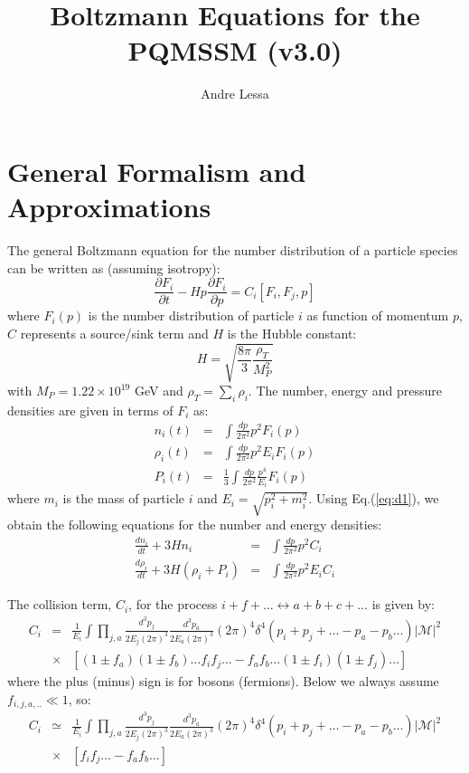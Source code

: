 \documentclass[preprint,notoc]{JHEP3}
\title{Boltzmann Equations for the PQMSSM (v3.0)}
\author{Andre Lessa}
\newcommand\drv[2]{\frac{\partial #1}{\partial #2}}
\newcommand\Drv[2]{\frac{d #1}{d #2}}
\begin{document}
\section{General Formalism and Approximations}

The general Boltzmann equation for the number distribution of a particle species can be written as\cite{turner} (assuming isotropy):
\begin{equation}
\drv{F_{i}}{t} -H p \drv{F_{i}}{p} = C_{i}[F_{i},F_{j},p] \label{eq:d1}
\end{equation}
where $F_{i}(p)$ is the number distribution of particle $i$ as function of momentum $p$, $C$ represents a source/sink term and $H$ is the Hubble constant:
\begin{equation}
H = \sqrt{\frac{8 \pi}{3} \frac{\rho_T}{M_P^2}} \label{H} 
\end{equation} 
with $M_{P} = 1.22\times 10^{19}$ GeV and $\rho_T = \sum_{i} \rho_i$. The number, energy and pressure densities are given in terms
of $F_{i}$ as:
\begin{eqnarray}
n_{i}(t) & = & \int \frac{dp}{2 \pi^2} p^2 F_i(p) \nonumber \\ 
\rho_{i}(t) & = & \int \frac{dp}{2 \pi^2} p^2 E_i F_i(p) \label{beqs}\\
P_{i}(t) & = & \frac{1}{3} \int \frac{dp}{2 \pi^2} \frac{p^4}{E_i} F_i(p) \nonumber
\end{eqnarray}
where $m_i$ is the mass of particle $i$ and $E_i = \sqrt{p_i^2 + m_i^2}$. Using Eq.(\ref{eq:d1}), we obtain the following equations for the number and energy densities:
\begin{eqnarray}
\Drv{n_i}{t} + 3H n_i & = & \int \frac{dp}{2 \pi^2} p^2 C_i \nonumber \\
\Drv{\rho_i}{t} + 3H (\rho_i + P_i) & = & \int \frac{dp}{2 \pi^2} p^2 E_i C_i \label{eq:meqs}
\end{eqnarray}

The collision term, $C_i$, for the process $i + f + \ldots \leftrightarrow a
+ b + c + \ldots$ is given by\cite{kawasaki0}:
\begin{eqnarray}
C_i & = & \frac{1}{E_i} \int \prod_{j,a} \frac{d^3 p_j}{2 E_j (2 \pi)^3}
\frac{d^3 p_a}{2 E_a (2 \pi)^3} (2 \pi)^4 \delta^{4}\left(p_i + p_j + \ldots - p_a - p_b
\ldots\right) |\mathcal{M}|^2 \nonumber \\
&\times& \left[(1 \pm f_a) (1 \pm
f_b)\ldots f_i f_j\ldots - f_a f_b \ldots (1 \pm f_i)(1 \pm f_j)\ldots \right]
\end{eqnarray}
where the plus (minus) sign is for bosons (fermions). Below we always assume
$f_{i,j,a,..} \ll 1$, so:
\begin{eqnarray}
C_i & \simeq & \frac{1}{E_i} \int \prod_{j,a} \frac{d^3 p_j}{2 E_j (2 \pi)^3}
\frac{d^3 p_a}{2 E_a (2 \pi)^3} (2 \pi)^4 \delta^{4}\left(p_i + p_j + \ldots - p_a - p_b
\ldots\right) |\mathcal{M}|^2 \nonumber \\
&\times& \left[f_i f_j\ldots - f_a f_b \ldots \right]
\end{eqnarray}
\end{document}
